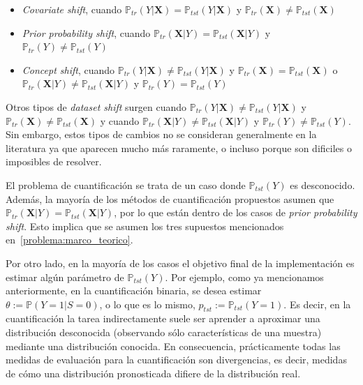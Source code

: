 \begin{itemize}
    \item {\it Covariate shift}, cuando $\mathbb{P}_{tr}(Y|\boldsymbol{X}) =
    \mathbb{P}_{tst}(Y|\boldsymbol{X})$ y $\mathbb{P}_{tr}(\boldsymbol{X}) \neq
    \mathbb{P}_{tst}(\boldsymbol{X})$
    \item {\it Prior probability shift}, cuando
    $\mathbb{P}_{tr}(\boldsymbol{X}|Y) = \mathbb{P}_{tst}(\boldsymbol{X}|Y)$ y
    $\mathbb{P}_{tr}(Y) \neq \mathbb{P}_{tst}(Y)$
    \item {\it Concept shift}, cuando $\mathbb{P}_{tr}(Y|\boldsymbol{X}) \neq
    \mathbb{P}_{tst}(Y|\boldsymbol{X})$ y $\mathbb{P}_{tr}(\boldsymbol{X}) =
    \mathbb{P}_{tst}(\boldsymbol{X})$ o $\mathbb{P}_{tr}(\boldsymbol{X}|Y) \neq
    \mathbb{P}_{tst}(\boldsymbol{X}|Y)$ y $\mathbb{P}_{tr}(Y) =
    \mathbb{P}_{tst}(Y)$
\end{itemize}

Otros tipos de {\it dataset shift\/} surgen cuando
$\mathbb{P}_{tr}(Y|\boldsymbol{X}) \neq \mathbb{P}_{tst}(Y|\boldsymbol{X})$ y
$\mathbb{P}_{tr}(\boldsymbol{X}) \neq \mathbb{P}_{tst}(\boldsymbol{X})$ y cuando
$\mathbb{P}_{tr}(\boldsymbol{X}|Y) \neq \mathbb{P}_{tst}(\boldsymbol{X}|Y)$ y
$\mathbb{P}_{tr}(Y) \neq \mathbb{P}_{tst}(Y)$. Sin embargo, estos tipos de
cambios no se consideran generalmente en la literatura ya que aparecen mucho más
raramente, o incluso porque son dificiles o imposibles de resolver.

El problema de cuantificación se trata de un caso donde $\mathbb{P}_{tst}(Y)$ es
desconocido. Además, la mayoría de los métodos de cuantificación propuestos
asumen que $\mathbb{P}_{tr}(\boldsymbol{X}|Y) =
\mathbb{P}_{tst}(\boldsymbol{X}|Y)$, por lo que están dentro de los casos de
{\it prior probability shift}. Esto implica que se asumen los tres supuestos
mencionados en~\ref{problema:marco_teorico}.

Por otro lado, en la mayoría de los casos el objetivo final de la implementación
es estimar algún parámetro de $\mathbb{P}_{tst}(Y)$. Por ejemplo, como ya
mencionamos anteriormente, en la cuantificación binaria, se desea estimar
$\theta:= \mathbb{P}(Y=1|S=0)$, o lo que es lo mismo, $p_{tst}:=
\mathbb{P}_{tst}(Y=1)$. Es decir, en la cuantificación la tarea indirectamente
suele ser aprender a aproximar una distribución desconocida (observando sólo
características de una muestra) mediante una distribución conocida. En
consecuencia, prácticamente todas las medidas de evaluación para la
cuantificación son divergencias, es decir, medidas de cómo una distribución
pronosticada difiere de la distribución real.

